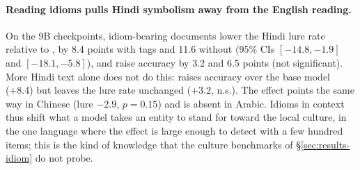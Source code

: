 \paragraph{Reading idioms pulls Hindi symbolism away from the English reading.}
On the 9B checkpoints, idiom-bearing documents lower the Hindi lure rate relative to \random{}, by 8.4 points with tags and 11.6 without (95\% CIs $[-14.8,-1.9]$ and $[-18.1,-5.8]$), and raise accuracy by 3.2 and 6.5 points (not significant). More Hindi text alone does not do this: \random{} raises accuracy over the base model (+8.4) but leaves the lure rate unchanged (+3.2, n.s.). The effect points the same way in Chinese (lure $-2.9$, $p{=}0.15$) and is absent in Arabic. Idioms in context thus shift what a model takes an entity to stand for toward the local culture, in the one language where the effect is large enough to detect with a few hundred items; this is the kind of knowledge that the culture benchmarks of \S\ref{sec:results-idiom} do not probe. 
